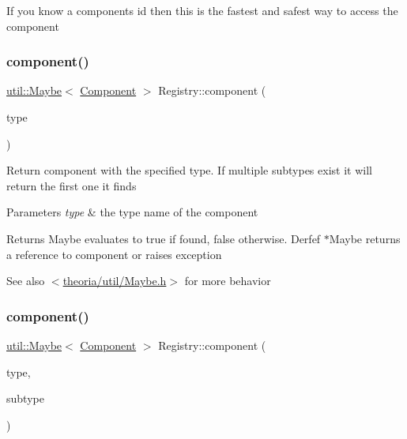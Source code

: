 If you know a component\textquotesingle{}s id then this is the fastest and safest way to access the component \mbox{\label{classtheoria_1_1core_1_1Registry_a7daaf0e52575c5dfbdb33c81953142f5}} 
\subsubsection{\texorpdfstring{component()}{component()}\hspace{0.1cm}{\footnotesize\ttfamily [2/4]}}
{\footnotesize\ttfamily \hyperlink{classtheoria_1_1util_1_1Maybe}{util\+::\+Maybe}$<$ \hyperlink{classtheoria_1_1core_1_1Component}{Component} $>$ Registry\+::component (\begin{DoxyParamCaption}\item[{const Type\+Name \&}]{type }\end{DoxyParamCaption})}

Return component with the specified type. If multiple subtypes exist it will return the first one it finds


\begin{DoxyParams}{Parameters}
{\em type} & the type name of the component \\
\hline
\end{DoxyParams}
\begin{DoxyReturn}{Returns}
Maybe evaluates to true if found, false otherwise. Derfef $\ast$\+Maybe returns a reference to component or raises exception 
\end{DoxyReturn}
\begin{DoxySeeAlso}{See also}
$<$\hyperlink{Maybe_8h_source}{theoria/util/\+Maybe.\+h}$>$ for more behavior 
\end{DoxySeeAlso}
\mbox{\label{classtheoria_1_1core_1_1Registry_a5a3cafd6ebd46a88fb5afb877a4b04ad}} 
\subsubsection{\texorpdfstring{component()}{component()}\hspace{0.1cm}{\footnotesize\ttfamily [3/4]}}
{\footnotesize\ttfamily \hyperlink{classtheoria_1_1util_1_1Maybe}{util\+::\+Maybe}$<$ \hyperlink{classtheoria_1_1core_1_1Component}{Component} $>$ Registry\+::component (\begin{DoxyParamCaption}\item[{const Type\+Name \&}]{type,  }\item[{const Sub\+Type\+Name \&}]{subtype }\end{DoxyParamCaption})}

